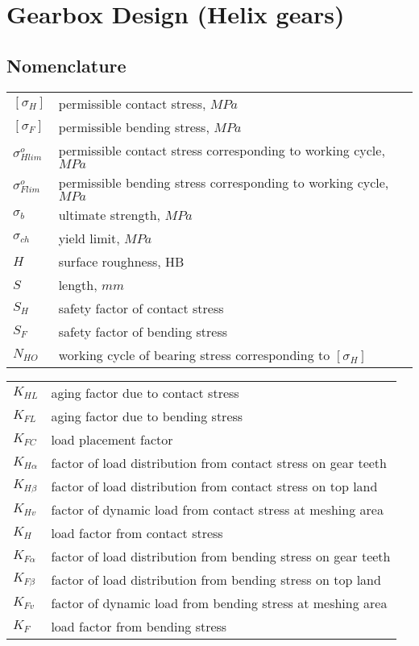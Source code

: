 \chapter{Gearbox Design (Helix gears)}
\section{Nomenclature}
	\begin{tabular}[t]{lp{7cm}}
		$ [\sigma_H] $ & permissible contact stress, $ MPa $\\
		$ [\sigma_F] $ & permissible bending stress, $ MPa $\\
		$ \sigma_{Hlim}^o $ & permissible contact stress corresponding to working cycle, $ MPa $\\
		$ \sigma_{Flim}^o $ & permissible bending stress corresponding to working cycle, $ MPa $\\
		$ \sigma_b $ & ultimate strength, $ MPa $\\
		$ \sigma_{ch} $ & yield limit, $ MPa $\\
		$ H $ & surface roughness, HB\\
		$ S $ & length, $ mm $\\
		$ S_H $ & safety factor of contact stress\\
		$ S_F $ & safety factor of bending stress\\
		$ N_{HO} $ & working cycle of bearing stress corresponding to $ [\sigma_H] $\\
	\end{tabular}
	\begin{tabular}[t]{lp{7cm}}
		$ K_{HL} $ & aging factor due to contact stress\\
		$ K_{FL} $ & aging factor due to bending stress\\
		$ K_{FC} $ & load placement factor\\
		$ K_{H\alpha} $ & factor of load distribution from contact stress on gear teeth\\
		$ K_{H\beta} $ & factor of load distribution from contact stress on top land\\
		$ K_{Hv} $ & factor of dynamic load from contact stress at meshing area\\
		$ K_H $ & load factor from contact stress\\
		$ K_{F\alpha} $ & factor of load distribution from bending stress on gear teeth\\
		$ K_{F\beta} $ & factor of load distribution from bending stress on top land\\
		$ K_{Fv} $ & factor of dynamic load from bending stress at meshing area\\
		$ K_F $ & load factor from bending stress\\
	\end{tabular}\newpage
